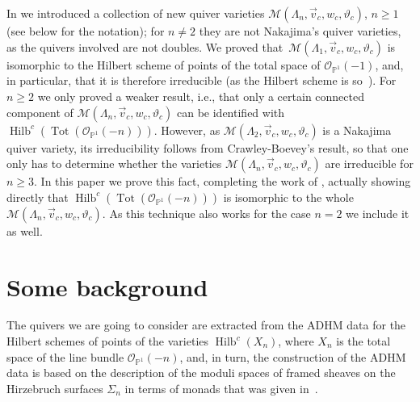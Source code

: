  In \cite{bblr} we introduced a collection of new quiver varieties $\mathcal{M} (\Lambda_n,\vec{v}_c,w_c, \vartheta_c)$, ${n\geq1}$ (see below for the notation);
 for $n\neq 2$ they are not Nakajima's quiver varieties, as the quivers involved are not doubles. We proved that~$\mathcal{M} (\Lambda_1,\vec{v}_c,w_c, \vartheta_c)$ is isomorphic to the Hilbert scheme of points of the total space of $\mathcal{O}_{\mathbb{P}^1}(-1)$, and, in particular, that it is therefore irreducible (as the Hilbert scheme is so~\cite{Fogarty}). For $n\geq 2$ we only proved a weaker result, i.e.,
 that only a certain connected component of $\mathcal{M} (\Lambda_n,\vec{v}_c,w_c, \vartheta_c)$ can be identified with $\operatorname{Hilb}^c(\operatorname{Tot}(\mathcal{O}_{\mathbb{P}^1}(-n)))$. However, as $\mathcal{M} (\Lambda_2,\vec{v}_c,w_c, \vartheta_c)$ is a Nakajima quiver variety, its irreducibility follows from Crawley-Boevey's result, so that one only has to determine whether the varieties $\mathcal{M} (\Lambda_n,\vec{v}_c,w_c, \vartheta_c)$ are irreducible for $n\geq 3$. In this paper we prove this fact, completing the work of \cite{bblr}, actually showing directly
 that $\operatorname{Hilb}^c(\operatorname{Tot}(\mathcal{O}_{\mathbb{P}^1}(-n)))$ is isomorphic to the whole
$\mathcal{M} (\Lambda_n,\vec{v}_c,w_c, \vartheta_c)$. As this technique also works for the case $n=2$ we include it as well.

\section{Some background } \label{background}
The quivers we are going to consider are extracted from the ADHM data for the Hilbert schemes of points of the varieties $\operatorname{Hilb}^c(X_n)$,
 where $X_n$ is the total space of the line bundle $\mathcal{O}_{\mathbb{P}^1}(-n)$,
and, in turn,
the construction of the ADHM data is based on the description of the moduli spaces of framed sheaves on the Hirzebruch surfaces $\Sigma_n$ in terms of monads that was given in~\cite{bbr}.
